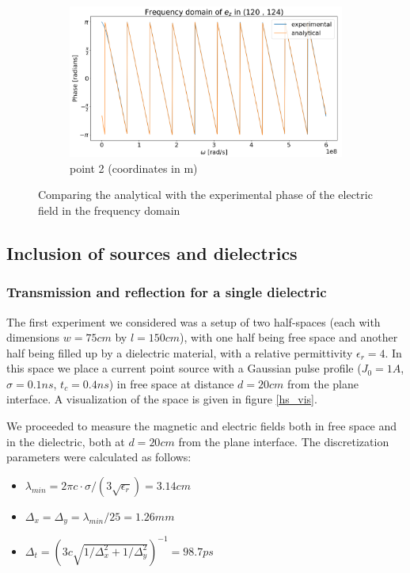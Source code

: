 \documentclass[11pt, a4paper]{article}
\begin{document}
\begin{figure}[h]
    \centering
    \begin{subfigure}{\textwidth}
        \includegraphics[width=0.95\linewidth]{fig/phase_hankel_2.png}
        \caption{point 2 (coordinates in m)}
        \label{fig:phase_code_validation_2}
    \end{subfigure}
    \caption{Comparing the analytical with the experimental phase of the electric field in the frequency domain}
\end{figure}

\newpage
\subsection{Inclusion of sources and dielectrics} %

\subsubsection{Transmission and reflection for a single dielectric}
The first experiment we considered was a setup of two half-spaces (each with dimensions $w=75 cm$ by $l=150 cm$), with one half being free space and another half being filled up by a dielectric material, with a relative permittivity $\epsilon_r = 4$. In this space we place a current point source with a Gaussian pulse profile ($J_0 = 1 A$, $\sigma = 0.1 ns$, $t_c = 0.4 ns$) in free space at distance $d = 20 cm$ from the plane interface. A visualization of the space is given in figure \ref{hs_vis}.

We proceeded to measure the magnetic and electric fields both in free space and in the dielectric, both at $d=20cm$ from the plane interface. The discretization parameters were calculated as follows:
\begin{itemize}
    \item $\lambda_{min} = 2 \pi c \cdot \sigma/(3\sqrt{\epsilon_r}) = 3.14 cm$
    \item $\Delta_x = \Delta_y = \lambda_{min}/25 = 1.26 mm$
    \item $\Delta_t = \left( 3c \sqrt{1/\Delta_x^2 + 1/\Delta_y^2} \right)^{-1} = 98.7 ps$
\end{itemize}
\end{document}
